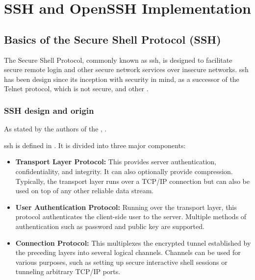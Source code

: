 \section{SSH and OpenSSH Implementation}\label{sec:background:ssh}

    \subsection{Basics of the Secure Shell Protocol (SSH)}
    
    The Secure Shell Protocol, commonly known as \acrshort{ssh}, is designed to facilitate secure remote login and other secure network services over insecure networks. \acrshort{ssh} has been design since its inception with security in mind, as a successor of the Telnet protocol, which is not secure, and other  \cite{SSHkex22}. 
    
    \subsubsection{SSH design and origin}
    As stated by the authors of the ,  \cite{SSHReport18}.

    \acrshort{ssh} is defined in  \cite{RFC4251}. It is divided into three major components:

    \begin{itemize}
        \item \textbf{Transport Layer Protocol:} This provides server authentication, confidentiality, and integrity. It can also optionally provide compression. Typically, the transport layer runs over a TCP/IP connection but can also be used on top of any other reliable data stream.
        \item \textbf{User Authentication Protocol:} Running over the transport layer, this protocol authenticates the client-side user to the server. Multiple methods of authentication such as password and public key are supported.
        \item \textbf{Connection Protocol:} This multiplexes the encrypted tunnel established by the preceding layers into several logical channels. Channels can be used for various purposes, such as setting up secure interactive shell sessions or tunneling arbitrary TCP/IP ports.
    \end{itemize}

